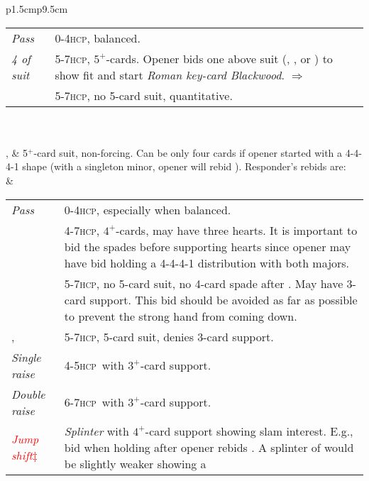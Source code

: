 \documentclass[a4paper,article,oneside]{memoir}
\newcommand{\hcp}{\textsc{hcp}}
\newcommand{\gf}[1]{\textcolor{red}{#1$\ddagger$}} %
\begin{document}
\begin{longtable}{ p{1.5cm}p{9.5cm}}
\begin{tabular}{p{1.5cm}p{6.5cm}}
             \emph{Pass} & 0-4\hcp, balanced. \\
             \emph{4 of
             suit} & 5-7\hcp, $5^+$-cards. Opener bids one above suit
                     (\di{4}, \he{4}, \sp{4} or \nt{4}) to show fit
                     and start \emph{Roman key-card Blackwood}.
                     \hyperlink{blackwood}{$\Rightarrow$} \\ 
             \nt{4} & 5-7\hcp, no 5-card suit, quantitative. \\
           \end{tabular} \\
   \\
  ,
   & 5$^+$-card suit, non-forcing. Can be only four cards if
           opener started with a 4-4-4-1 shape (with a singleton
           minor, opener will rebid ). Responder's rebids are: \\ 
         & \begin{tabular}{lp{6.7cm}}
             \emph{Pass} & 0-4\hcp, especially when balanced. \\
             \sp{1} & 4-7\hcp, $4^+$-cards, may have three hearts. It
                      is important to bid the spades before supporting
                      hearts since opener may have bid \he{1} holding
                      a 4-4-4-1 distribution with both majors. \\
             \nt{1} & 5-7\hcp, no 5-card suit, no 4-card spade after
                      \he{1}. May have 3-card support. This bid should
                      be avoided as far as possible to prevent the
                      strong hand from coming down. \\
             \cl{2},
             \di{2} & 5-7\hcp, 5-card suit, denies 3-card support. \\
             \emph{Single raise} & 4-5\hcp\ with $3^+$-card support. \\
             \emph{Double raise} & 6-7\hcp\ with $3^+$-card support. \\
             \gf{\emph{Jump shift}} & \emph{Splinter} with $4^+$-card
                                      support showing slam
                                      interest. E.g., bid \cl{4} when
                                      holding \hhand{JT98,93,AJT987,5}
                                      after opener rebids \sp{1}. A
                                      splinter of \cl{3} would be
                                      slightly weaker showing a

\end{tabular}
\end{longtable}
\end{document}
